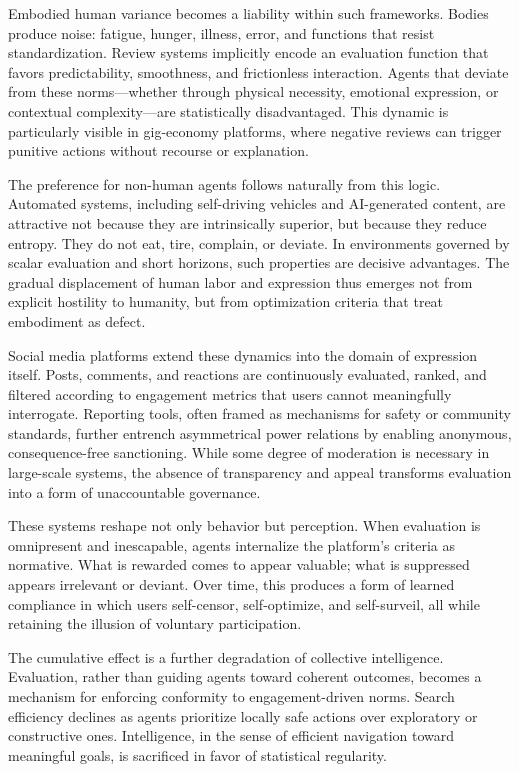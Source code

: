 \documentclass[12pt]{article}
\begin{document}
Embodied human variance becomes a liability within such frameworks. Bodies produce noise: fatigue, hunger, illness, error, and functions that resist standardization. Review systems implicitly encode an evaluation function that favors predictability, smoothness, and frictionless interaction. Agents that deviate from these norms—whether through physical necessity, emotional expression, or contextual complexity—are statistically disadvantaged. This dynamic is particularly visible in gig-economy platforms, where negative reviews can trigger punitive actions without recourse or explanation.

The preference for non-human agents follows naturally from this logic. Automated systems, including self-driving vehicles and AI-generated content, are attractive not because they are intrinsically superior, but because they reduce entropy. They do not eat, tire, complain, or deviate. In environments governed by scalar evaluation and short horizons, such properties are decisive advantages. The gradual displacement of human labor and expression thus emerges not from explicit hostility to humanity, but from optimization criteria that treat embodiment as defect.

Social media platforms extend these dynamics into the domain of expression itself. Posts, comments, and reactions are continuously evaluated, ranked, and filtered according to engagement metrics that users cannot meaningfully interrogate. Reporting tools, often framed as mechanisms for safety or community standards, further entrench asymmetrical power relations by enabling anonymous, consequence-free sanctioning. While some degree of moderation is necessary in large-scale systems, the absence of transparency and appeal transforms evaluation into a form of unaccountable governance.

These systems reshape not only behavior but perception. When evaluation is omnipresent and inescapable, agents internalize the platform’s criteria as normative. What is rewarded comes to appear valuable; what is suppressed appears irrelevant or deviant. Over time, this produces a form of learned compliance in which users self-censor, self-optimize, and self-surveil, all while retaining the illusion of voluntary participation.

The cumulative effect is a further degradation of collective intelligence. Evaluation, rather than guiding agents toward coherent outcomes, becomes a mechanism for enforcing conformity to engagement-driven norms. Search efficiency declines as agents prioritize locally safe actions over exploratory or constructive ones. Intelligence, in the sense of efficient navigation toward meaningful goals, is sacrificed in favor of statistical regularity.
\end{document}
